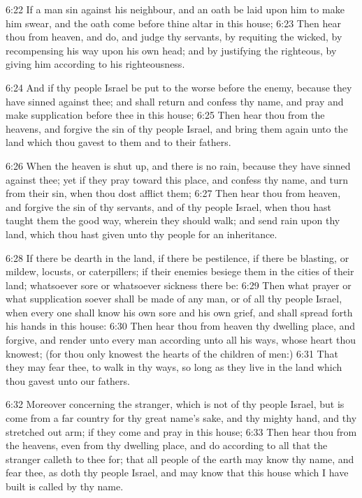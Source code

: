 6:22 If a man sin against his neighbour, and an oath be laid upon him to make him swear, and the oath come before thine altar in this house; 6:23 Then hear thou from heaven, and do, and judge thy servants, by requiting the wicked, by recompensing his way upon his own head; and by justifying the righteous, by giving him according to his righteousness.

6:24 And if thy people Israel be put to the worse before the enemy, because they have sinned against thee; and shall return and confess thy name, and pray and make supplication before thee in this house; 6:25 Then hear thou from the heavens, and forgive the sin of thy people Israel, and bring them again unto the land which thou gavest to them and to their fathers.

6:26 When the heaven is shut up, and there is no rain, because they have sinned against thee; yet if they pray toward this place, and confess thy name, and turn from their sin, when thou dost afflict them; 6:27 Then hear thou from heaven, and forgive the sin of thy servants, and of thy people Israel, when thou hast taught them the good way, wherein they should walk; and send rain upon thy land, which thou hast given unto thy people for an inheritance.

6:28 If there be dearth in the land, if there be pestilence, if there be blasting, or mildew, locusts, or caterpillers; if their enemies besiege them in the cities of their land; whatsoever sore or whatsoever sickness there be: 6:29 Then what prayer or what supplication soever shall be made of any man, or of all thy people Israel, when every one shall know his own sore and his own grief, and shall spread forth his hands in this house: 6:30 Then hear thou from heaven thy dwelling place, and forgive, and render unto every man according unto all his ways, whose heart thou knowest; (for thou only knowest the hearts of the children of men:) 6:31 That they may fear thee, to walk in thy ways, so long as they live in the land which thou gavest unto our fathers.

6:32 Moreover concerning the stranger, which is not of thy people Israel, but is come from a far country for thy great name's sake, and thy mighty hand, and thy stretched out arm; if they come and pray in this house; 6:33 Then hear thou from the heavens, even from thy dwelling place, and do according to all that the stranger calleth to thee for; that all people of the earth may know thy name, and fear thee, as doth thy people Israel, and may know that this house which I have built is called by thy name.

